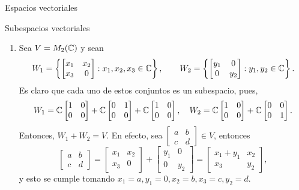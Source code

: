 \begin{chapter}{Espacios vectoriales}
\begin{section}{Subespacios vectoriales}
\begin{ejemplo*}
\begin{enumerate}
            \item Sea $V = M_2(\mathbb C)$ y sean 
            \begin{equation*}
                W_1 = \left\{\begin{bmatrix} x_1&x_2\\x_3&0 \end{bmatrix}: x_1,x_2,x_3 \in \mathbb C \right\}, 
                \qquad W_2 = \left\{\begin{bmatrix} y_1&0\\0&y_2 \end{bmatrix}: y_1,y_2 \in \mathbb C \right\}.
            \end{equation*} 
            Es claro que cada uno de estos conjuntos es un subespacio, pues,
            $$
            W_1 = \mathbb C \begin{bmatrix} 1&0\\0&0 \end{bmatrix} +
            \mathbb C \begin{bmatrix} 0&1\\0&0 \end{bmatrix} +
            \mathbb C \begin{bmatrix} 1&0\\0&0 \end{bmatrix}, \quad 
            W_2 = \mathbb C \begin{bmatrix} 1&0\\0&0 \end{bmatrix} +
            \mathbb C \begin{bmatrix} 0&0\\0&1 \end{bmatrix}. 
            $$
            Entonces, $W_1 + W_2 = V$. En  efecto, sea 
            $\begin{bmatrix} a&b\\c&d\end{bmatrix} \in V$, entonces
            $$
            \begin{bmatrix} a&b\\c&d\end{bmatrix} =  \begin{bmatrix} x_1&x_2\\x_3&0 \end{bmatrix} + 
            \begin{bmatrix} y_1&0\\0&y_2 \end{bmatrix} =
            \begin{bmatrix} x_1+y_1&x_2\\x_3&y_2 \end{bmatrix},
            $$
            y esto se cumple  tomando $x_1 = a, y_1 =0,  x_2 = b, x_3= c, y_2 =d$.
            

\end{enumerate}
\end{ejemplo*}
\end{section}
\end{chapter}
